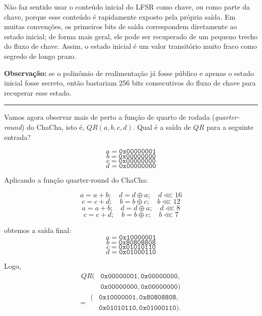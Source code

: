 \documentclass[12pt,a4paper]{article}
\newcommand{\exercicio}[1]{%
    \par\vspace{1.2em}
    \noindent
    {\color{black!55}\rule[-0.25em]{3pt}{1.6em}}%
    \hspace{0.6em}{\Large\bfseries Exerc\'{i}cio #1}
    \par\vspace{-0.4em}
    \noindent{\color{black!35}\rule{\textwidth}{0.4pt}}
    \par\vspace{0.35em}
}
\newenvironment{resposta}{%
    \begin{respostabox}
    \color{red!70!black}\sloppy
}{%
    \end{respostabox}
}
\begin{document}
\begin{resposta}
\begin{enumerate}[label=\arabic*.]
    Não faz sentido usar o conteúdo inicial do LFSR como chave, ou como parte da chave, porque esse conteúdo é rapidamente exposto pela própria saída. Em muitas convenções, os primeiros bits de saída correspondem diretamente ao estado inicial; de forma mais geral, ele pode ser recuperado de um pequeno trecho do fluxo de chave. Assim, o estado inicial é um valor transitório muito fraco como segredo de longo prazo.
\end{enumerate}

\textbf{Observação:} se o polinômio de realimentação já fosse público e apenas o estado inicial fosse secreto, então bastariam 256 bits consecutivos do fluxo de chave para recuperar esse estado.
\end{resposta}

\exercicio{9}
Vamos agora observar mais de perto a função de quarto de rodada (\emph{quarter-round}) do ChaCha, isto é, $QR(a,b,c,d)$. Qual é a saída de $QR$ para a seguinte entrada?

\[
a = \texttt{0x00000001}
\]
\[
b = \texttt{0x00000000}
\]
\[
c = \texttt{0x00000000}
\]
\[
d = \texttt{0x00000000}
\]

\begin{resposta}

Aplicando a função quarter-round do ChaCha:

\[
a = a + b;\quad d = d \oplus a;\quad d \lll 16
\]
\[
c = c + d;\quad b = b \oplus c;\quad b \lll 12
\]
\[
a = a + b;\quad d = d \oplus a;\quad d \lll 8
\]
\[
c = c + d;\quad b = b \oplus c;\quad b \lll 7
\]

obtemos a saída final:
\[
a = \texttt{0x10000001}
\]
\[
b = \texttt{0x80808808}
\]
\[
c = \texttt{0x01010110}
\]
\[
d = \texttt{0x01000110}
\]

Logo,
\[
\begin{aligned}
QR(&\texttt{0x00000001},\texttt{0x00000000},\\
   &\texttt{0x00000000},\texttt{0x00000000})
\end{aligned}
\]
\[
=
\begin{aligned}
(&\texttt{0x10000001},\texttt{0x80808808},\\
 &\texttt{0x01010110},\texttt{0x01000110}).
\end{aligned}
\]
\end{resposta}
\end{document}
